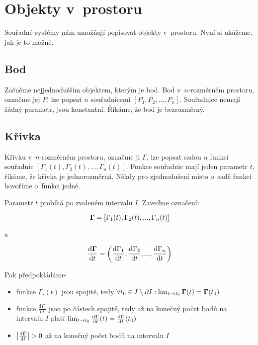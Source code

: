 \section{Objekty v~prostoru}

Souřadné systémy nám umožňují popisovat objekty v~prostoru. Nyní si ukážeme, jak je to možné.

\subsection{Bod}

Začněme nejjednodušším objektem, kterým je bod. Bod v~\(n\)-rozměrném prostoru, označme jej \(P\), lze popsat \(n\) souřadnicemi \([P_1, P_2, ..., P_n]\). Souřadnice nemají žádný parametr, jsou konstantní. Říkáme, že bod je bezrozměrný.

\subsection{Křivka}

Křivku v~\(n\)-rozměrném prostoru, označme ji \(\Gamma\), lze popsat sadou \(n\) funkcí souřadnic \([\Gamma_1(t), \Gamma_2(t), ..., \Gamma_n(t)]\). Funkce souřadnic mají jeden parametr \(t\), říkáme, že křivka je jednorozměrná. Někdy pro zjednodušení místo o~sadě funkcí hovoříme o~funkci jedné.

Parametr \(t\) probíhá po zvoleném intervalu \(I\). Zaveďme označení:

\begin{equation}
\boldsymbol{\Gamma} = [\Gamma_1(t), \Gamma_2(t), ..., \Gamma_n(t)]
\end{equation}

a

\begin{equation}
\frac{\mathrm{d}\boldsymbol{\Gamma}}{\mathrm{d}t} = \left(\frac{\mathrm{d}\Gamma_1}{\mathrm{d}t}, \frac{\mathrm{d}\Gamma_2}{\mathrm{d}t}, ..., \frac{\mathrm{d}\Gamma_n}{\mathrm{d}t} \right)
\end{equation}

Pak předpokládáme:

\begin{itemize}
\item funkce \(\Gamma_i(t)\) jsou spojité, tedy \(\forall t_0 \in I \setminus \partial I: \lim_{t \to t_0} \boldsymbol{\Gamma}(t) = \boldsymbol{\Gamma}(t_0)\)
\item funkce \(\frac{\mathrm{d}\Gamma_i}{\mathrm{d}t}\) jsou po částech spojité, tedy až na konečný počet bodů na intervalu \(I\) platí \(\lim_{t \to t_0} \frac{\mathrm{d}\boldsymbol{\Gamma}}{\mathrm{d}t}(t) = \frac{\mathrm{d}\boldsymbol{\Gamma}}{\mathrm{d}t}(t_0)\)
\item \(\left|\frac{\mathrm{d}\boldsymbol{\Gamma}}{\mathrm{d}t} \right| > 0\) až na konečný počet bodů na intervalu \(I\)
\end{itemize}

